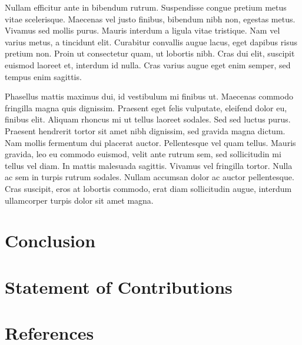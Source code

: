 \documentclass[conference]{IEEEtran}
\begin{document}
Nullam efficitur ante in bibendum rutrum. Suspendisse congue pretium metus vitae scelerisque. Maecenas vel justo finibus, bibendum nibh non, egestas metus. Vivamus sed mollis purus. Mauris interdum a ligula vitae tristique. Nam vel varius metus, a tincidunt elit. Curabitur convallis augue lacus, eget dapibus risus pretium non. Proin ut consectetur quam, ut lobortis nibh. Cras dui elit, suscipit euismod laoreet et, interdum id nulla. Cras varius augue eget enim semper, sed tempus enim sagittis.

Phasellus mattis maximus dui, id vestibulum mi finibus ut. Maecenas commodo fringilla magna quis dignissim. Praesent eget felis vulputate, eleifend dolor eu, finibus elit. Aliquam rhoncus mi ut tellus laoreet sodales. Sed sed luctus purus. Praesent hendrerit tortor sit amet nibh dignissim, sed gravida magna dictum. Nam mollis fermentum dui placerat auctor. Pellentesque vel quam tellus. Mauris gravida, leo eu commodo euismod, velit ante rutrum sem, sed sollicitudin mi tellus vel diam. In mattis malesuada sagittis. Vivamus vel fringilla tortor. Nulla ac sem in turpis rutrum sodales. Nullam accumsan dolor ac auctor pellentesque. Cras suscipit, eros at lobortis commodo, erat diam sollicitudin augue, interdum ullamcorper turpis dolor sit amet magna. 

\section{Conclusion}

\section{Statement of Contributions}

\section{References}
\end{document}
